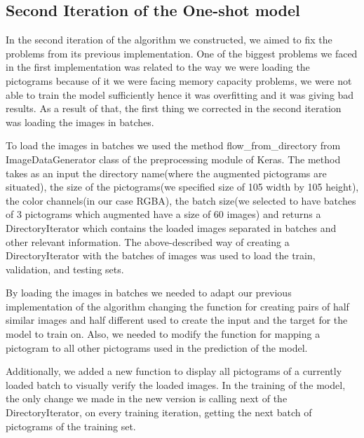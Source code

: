 \subsection{Second Iteration of the One-shot model}
In the second iteration of the algorithm we constructed, we aimed to fix the problems from its previous implementation. One of the biggest problems we faced in the first implementation was related to the way we were loading the pictograms because of it we were facing memory capacity problems, we were not able to train the model sufficiently hence it was overfitting and it was giving bad results. As a result of that, the first thing we corrected in the second iteration was loading the images in batches.

To load the images in batches we used the method flow_from_directory from ImageDataGenerator class of the preprocessing module of Keras. The method takes as an input the directory name(where the augmented pictograms are situated), the size of the pictograms(we specified size of 105 width by 105 height), the color channels(in our case RGBA), the batch size(we selected to have batches of 3 pictograms which augmented have a size of 60 images) and returns a DirectoryIterator which contains the loaded images separated in batches and other relevant information. The above-described way of creating a DirectoryIterator with the batches of images was used to load the train, validation, and testing sets.

By loading the images in batches we needed to adapt our previous implementation of the algorithm changing the function for creating pairs of half similar images and half different used to create the input and the target for the model to train on. Also, we needed to modify the function for mapping a pictogram to all other pictograms used in the prediction of the model. 

Additionally, we added a new function to display all pictograms of a currently loaded batch to visually verify the loaded images.
In the training of the model, the only change we made in the new version is calling next of the DirectoryIterator, on every training iteration, getting the next batch of pictograms of the training set.

